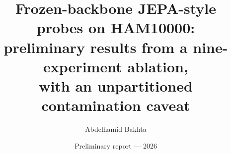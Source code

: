 \documentclass[11pt,a4paper]{article}
\title{Frozen-backbone JEPA-style probes on HAM10000:\\
       preliminary results from a nine-experiment ablation,\\
       with an unpartitioned contamination caveat}
\author{Abdelhamid Bakhta}
\affil{\href{https://github.com/AbdelStark/derma-jepa}{github.com/AbdelStark/derma-jepa}}
\date{Preliminary report --- 2026}
\begin{document}
\maketitle

\begin{abstract}

\end{abstract}















\appendix









\end{document}
